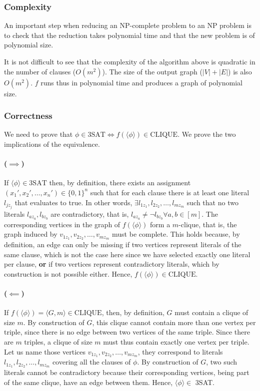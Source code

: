 \documentclass{article}
\DeclareMathOperator{\Forall}{\forall}
\newcommand{\card}[1]{|#1|}
\begin{document}
\subsubsection{Complexity}
An important step when reducing an NP-complete problem to an NP problem is to
check that the reduction takes polynomial time and that the new problem is of
polynomial size.

It is not difficult to see that the complexity of the algorithm above is
quadratic in the number of clauses (\(O(m^2)\)). The size of the output graph
(\(\card{V} + \card{E}\)) is also \(O(m^2)\). \(f\) runs thus in polynomial
time and produces a graph of polynomial size.

\subsubsection{Correctness}

We need to prove that \(\phi \in \text{3SAT} \iff f(\langle \phi \rangle) \in
\text{CLIQUE}\). We prove the two implications of the equivalence.

\paragraph{(\(\implies\))} If \(\langle\phi\rangle \in \text{3SAT}\) then, by definition,
there exists an assignment \((x_1', x_2', \ldots, x_n') \in \{0,1\}^n\) such
that for each clause there is at least one literal \(l_{jz_j}\) that evaluates
to true. In other words, \(\exists l_{1z_1},l_{2z_2},\ldots,l_{mz_m}\) such
that no two literals \(l_{az_a},l_{bz_b}\) are contradictory, that is,
\(l_{az_a} \neq \lnot l_{bz_b} \Forall a,b \in [m]\). The corresponding
vertices in the graph of \(f(\langle \phi \rangle)\) form a \(m\)-clique, that
is, the graph induced by \(v_{1z_1},v_{2z_2},\ldots,v_{mz_m}\) must be
complete. This holds because, by definition, an edge can only be missing if two
vertices represent literals of the same clause, which is not the case here
since we have selected exactly one literal per clause, \textbf{or} if two
vertices represent contradictory literals, which by construction is not
possible either. Hence, \(f(\langle \phi \rangle) \in \text{CLIQUE}\).

\paragraph{(\(\impliedby\))} If \(f(\langle \phi \rangle) = \langle G, m \rangle \in \text{CLIQUE}\),
then, by definition, \(G\) must contain a clique of size \(m\). By
construction of \(G\), this clique cannot contain more than one vertex per
triple, since there is no edge between two vertices of the same triple. Since
there are \(m\) triples, a clique of size \(m\) must thus contain exactly one
vertex per triple. Let us name those vertices
\(v_{1z_1},v_{2z_2},\ldots,v_{mz_m}\), they correspond to literals
\(l_{1z_1},l_{2z_2},\ldots,l_{mz_m}\) covering all the clauses of \(\phi\).
By construction of \(G\), two such literals cannot be contradictory because
their corresponding vertices, being part of the same clique, have an edge
between them. Hence, \(\langle \phi \rangle \in\) 3SAT.
\end{document}
